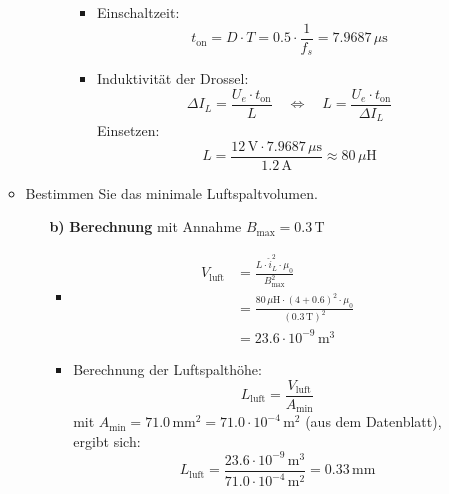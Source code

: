 \documentclass{article}
\begin{document}
\begin{enumerate}
\begin{itemize}
\begin{itemize}
\begin{enumerate}
\begin{itemize}
                    \item Einschaltzeit:
                    \[
                    t_{\text{on}} = D \cdot T = 0.5 \cdot \frac{1}{f_s} = 7.9687\,\mu\text{s}
                    \]
            
                    \item Induktivität der Drossel:
                    \[
                    \Delta I_L = \frac{U_e \cdot t_{\text{on}}}{L} \quad \Leftrightarrow \quad L = \frac{U_e \cdot t_{\text{on}}}{\Delta I_L}
                    \]
                    Einsetzen:
                    \[
                    L = \frac{12\,\text{V} \cdot 7.9687\,\mu\text{s}}{1.2\,\text{A}} \approx 80\,\mu\text{H}
                    \]
                \end{itemize}
            \end{enumerate}
        \end{itemize}

        \item Bestimmen Sie das minimale Luftspaltvolumen.
        \begin{enumerate}
            \item[\textbf{b)}] \textbf{Berechnung} mit Annahme \(B_{\text{max}} = 0.3\,\text{T}\)
            \begin{itemize}
                \item \begin{align*}
                    V_{\text{luft}} &= \frac{L \cdot \hat{i}_L^2 \cdot \mu_0}{B_{\text{max}}^2} \\
                    &= \frac{80 \, \mu\text{H} \cdot (4 + 0.6)^2 \cdot \mu_0}{(0.3\,\text{T})^2} \\
                    &= 23.6 \cdot 10^{-9}\,\text{m}^3
                \end{align*}            

                \item Berechnung der Luftspalthöhe:
                \[
                L_{\text{luft}} = \frac{V_{\text{luft}}}{A_{\text{min}}}
                \]
                mit $A_{\text{min}} = 71.0\,\text{mm}^2 = 71.0 \cdot 10^{-4}\,\text{m}^2$ (aus dem Datenblatt), ergibt sich:
                \[
                L_{\text{luft}} = \frac{23.6 \cdot 10^{-9}\,\text{m}^3}{71.0 \cdot 10^{-4}\,\text{m}^2} = 0.33\,\text{mm}
                \]

            \end{itemize}
        \end{enumerate}


\end{itemize}
\end{enumerate}
\end{document}
